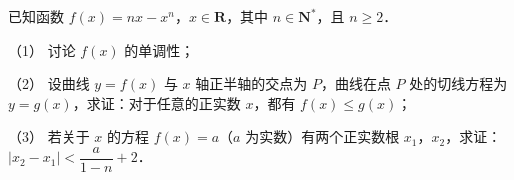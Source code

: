 \begin{question}
已知函数 \(f(x)=nx-x^n\)，\(x\in\mathbf{R}\)，其中 \(n\in\mathbf{N}^{*}\)，且 \(n\geqslant2\)．

（1） 讨论 \(f(x)\) 的单调性；

（2） 设曲线 \(y=f(x)\) 与 \(x\) 轴正半轴的交点为 \(P\)，曲线在点 \(P\) 处的切线方程为 \(y=g(x)\)，求证：对于任意的正实数 \(x\)，都有 \(f(x)\leqslant g(x)\)；

（3） 若关于 \(x\) 的方程 \(f(x)=a\)（\(a\) 为实数）有两个正实数根 \(x_1\)，\(x_2\)，求证：\(|x_2-x_1|<\dfrac{a}{1-n}+2\)．

\end{question}
